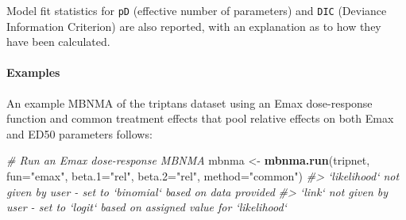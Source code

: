 \documentclass[]{article}
\newenvironment{Shaded}{\begin{snugshade}}{\end{snugshade}}
\newcommand{\CommentTok}[1]{\textcolor[rgb]{0.56,0.35,0.01}{\textit{#1}}}
\newcommand{\DataTypeTok}[1]{\textcolor[rgb]{0.13,0.29,0.53}{#1}}
\newcommand{\KeywordTok}[1]{\textcolor[rgb]{0.13,0.29,0.53}{\textbf{#1}}}
\newcommand{\NormalTok}[1]{#1}
\newcommand{\StringTok}[1]{\textcolor[rgb]{0.31,0.60,0.02}{#1}}
\let\oldparagraph\paragraph
\renewcommand{\paragraph}[1]{\oldparagraph{#1}\mbox{}}
\begin{document}
Model fit statistics for \texttt{pD} (effective number of parameters)
and \texttt{DIC} (Deviance Information Criterion) are also reported,
with an explanation as to how they have been calculated.

\hypertarget{examples}{%
\paragraph{Examples}\label{examples}}

An example MBNMA of the triptans dataset using an Emax dose-response
function and common treatment effects that pool relative effects on both
Emax and ED50 parameters follows:

\begin{Shaded}
\begin{Highlighting}[]
\CommentTok{# Run an Emax dose-response MBNMA}
\NormalTok{mbnma <-}\StringTok{ }\KeywordTok{mbnma.run}\NormalTok{(tripnet, }\DataTypeTok{fun=}\StringTok{"emax"}\NormalTok{, }
                   \DataTypeTok{beta.1=}\StringTok{"rel"}\NormalTok{, }\DataTypeTok{beta.2=}\StringTok{"rel"}\NormalTok{, }\DataTypeTok{method=}\StringTok{"common"}\NormalTok{)}
\CommentTok{#> `likelihood` not given by user - set to `binomial` based on data provided}
\CommentTok{#> `link` not given by user - set to `logit` based on assigned value for `likelihood`}
\end{Highlighting}
\end{Shaded}
\end{document}
